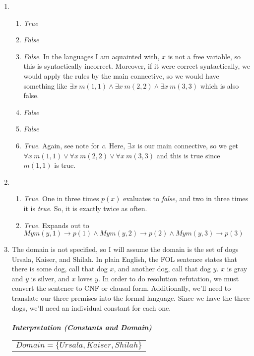 \documentclass{article}
\begin{document}
\begin{enumerate}
    \item %
    \begin{enumerate}
        \item \textit{True}
        \item \textit{False}
        \item \textit{False}. In the languages I am aquainted with, $x$ is not a free variable, so this is syntactically incorrect. Moreover, if it were correct syntactically, we would apply the rules by the main connective, so we would have something like $\exists x\ m(1,1) \wedge \exists x\ m(2, 2) \wedge \exists x\ m(3, 3)$ which is also false.
        \item \textit{False}
        \item \textit{False}
        \item \textit{True}. Again, see note for \textit{c}. Here, $\exists x$ is our main connective, so we get $\forall x\ m(1,1) \vee \forall x\ m(2, 2) \vee \forall x\ m(3, 3)$ and this is true since $m(1,1)$ is true.
    \end{enumerate}
    \item
    \begin{enumerate}
        \item \textit{True}. One in three times $p(x)$ evaluates to \textit{false}, and two in three times it is \textit{true}. So, it is exactly twice as often.
        \item \textit{True}. Expands out to $My m(y,1) \rightarrow p(1) \wedge My m(y,2) \rightarrow p(2) \wedge My m(y,3) \rightarrow p(3)$
    \end{enumerate}
    \pagebreak
    \item %
    The domain is not specified, so I will assume the domain is the set of dogs Ursala, Kaiser, and Shilah. In plain English, the FOL sentence states that there is some dog, call that dog $x$, and another dog, call that dog $y$. $x$ is gray and $y$ is silver, and $x$ loves $y$. In order to do resolution refutation, we must convert the sentence to CNF or clausal form. Additionally, we'll need to translate our three premises into the formal language. Since we have the three dogs, we'll need an individual constant for each one.\\\\
    \textit{\textbf{Interpretation (Constants and Domain)}}\\
    \begin{tabular}{l}
        $Domain = \{Ursala, Kaiser, Shilah\}$\\

\end{tabular}
\end{enumerate}
\end{document}
